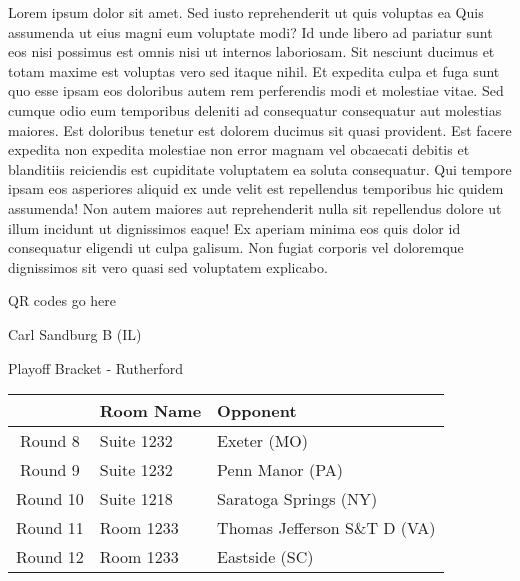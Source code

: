 \documentclass{article}%
\begin{document}
\vspace*{8pt}%
\linebreak%
\newline%
\newline%
Lorem ipsum dolor sit amet. Sed iusto reprehenderit ut quis voluptas ea Quis assumenda ut eius magni eum voluptate modi? Id unde libero ad pariatur sunt eos nisi possimus est omnis nisi ut internos laboriosam. Sit nesciunt ducimus et totam maxime est voluptas vero sed itaque nihil. Et expedita culpa et fuga sunt quo esse ipsam eos doloribus autem rem perferendis modi et molestiae vitae.\newline%
\newline%
Sed cumque odio eum temporibus deleniti ad consequatur consequatur aut molestias maiores. Est doloribus tenetur est dolorem ducimus sit quasi provident. Est facere expedita non expedita molestiae non error magnam vel obcaecati debitis et blanditiis reiciendis est cupiditate voluptatem ea soluta consequatur. Qui tempore ipsam eos asperiores aliquid ex unde velit est repellendus temporibus hic quidem assumenda!\newline%
\newline%
Non autem maiores aut reprehenderit nulla sit repellendus dolore ut illum incidunt ut dignissimos eaque! Ex aperiam minima eos quis dolor id consequatur eligendi ut culpa galisum. Non fugiat corporis vel doloremque dignissimos sit vero quasi sed voluptatem explicabo.\newline%
\newline%
%
\vspace*{30pt}%
\begin{center}%
\begin{Huge}%
QR codes go here%
\end{Huge}%
\end{center}%
\newpage%
\begin{center}%
\begin{Huge}%
Carl Sandburg B (IL)%
\end{Huge}%
\vspace*{8pt}%
\linebreak%
\begin{Large}%
Playoff Bracket {-} Rutherford%
\end{Large}%
\end{center}%
%
\begin{tabularx}{\textwidth}{|c|Y|Y|}%
\hline%
&Room Name&Opponent\\%
\hline%
Round 8&Suite 1232&Exeter (MO)\\%
Round 9&Suite 1232&Penn Manor (PA)\\%
Round 10&Suite 1218&Saratoga Springs (NY)\\%
Round 11&Room 1233&Thomas Jefferson S\&T D (VA)\\%
Round 12&Room 1233&Eastside (SC)\\%
\hline%
\end{tabularx}%
\end{document}
